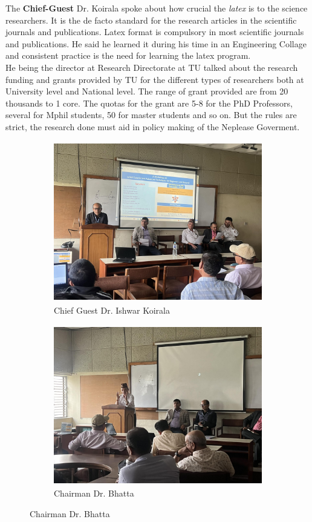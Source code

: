 \documentclass[a4paper,12pt]{report}
\begin{document}
\noindent
The \textbf{Chief-Guest} Dr. Koirala spoke about how crucial the \textit{latex} is to the science researchers. It is the de facto standard for the research articles in the scientific journals and publications. Latex format is compulsory in most scientific journals and publications. He said he learned it during his time in an Engineering Collage and consistent practice is the need for learning the latex program.\\
He being the director at Research Directorate at TU talked about the research funding and grants provided by TU for the different types of researchers both at University level and National level. The range of grant provided are from 20 thousands to 1 core. The quotas for the grant are 5-8 for the PhD Professors, several for Mphil students, 50 for master students  and so on. But the rules are strict, the research done must aid in policy making of the Neplease Goverment.

\vspace{5mm}
\begin{figure}[h!]
  \centering
  \begin{subfigure}{0.52\textwidth}
    \includegraphics[height=7cm, width=\textwidth]{cheifguest.jpg}
    \caption{Chief Guest Dr. Ishwar Koirala}
    \label{fig:first}
\end{subfigure}
\hfill
\begin{subfigure}{0.42\textwidth}
    \includegraphics[height=7cm, width=\textwidth]{chet.jpg}
    \caption{Chairman Dr. Bhatta}
    \label{fig:second}
\end{subfigure}
\end{figure}
\end{document}
